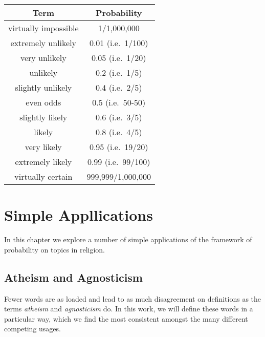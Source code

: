\documentclass{tufte-book}
\begin{document}
\begin{longtable}[c]{@{}cc@{}}
\toprule
Term & Probability\tabularnewline
\midrule
\endhead
virtually impossible & 1/1,000,000\tabularnewline
extremely unlikely & 0.01 (i.e.~1/100)\tabularnewline
very unlikely & 0.05 (i.e.~1/20)\tabularnewline
unlikely & 0.2 (i.e.~1/5)\tabularnewline
slightly unlikely & 0.4 (i.e.~2/5)\tabularnewline
even odds & 0.5 (i.e.~50-50)\tabularnewline
slightly likely & 0.6 (i.e.~3/5)\tabularnewline
likely & 0.8 (i.e.~4/5)\tabularnewline
very likely & 0.95 (i.e.~19/20)\tabularnewline
extremely likely & 0.99 (i.e.~99/100)\tabularnewline
virtually certain & 999,999/1,000,000\tabularnewline
\bottomrule
\end{longtable}

\chapter{Simple Appllications}\label{simple-appllications}

In this chapter we explore a number of simple applications of the
framework of probability on topics in religion.

\section{Atheism and Agnosticism}\label{atheism-and-agnosticism}

Fewer words are as loaded and lead to as much disagreement on
definitions as the terms \emph{atheism} and \emph{agnosticism} do. In
this work, we will define these words in a particular way, which we find
the most consistent amongst the many different competing usages.
\end{document}
